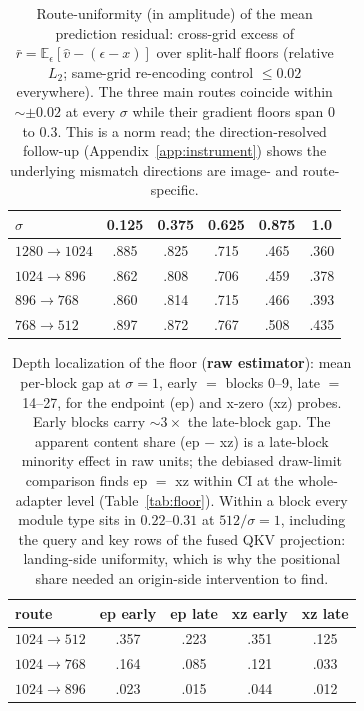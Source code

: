 \begin{table}[h]
\caption{Route-uniformity (in amplitude) of the mean prediction
residual: cross-grid
excess of $\bar r = \mathbb{E}_\epsilon[\hat v - (\epsilon - x)]$ over
split-half floors (relative $L_2$; same-grid re-encoding control
$\le 0.02$ everywhere). The three main routes coincide within
${\sim}\pm 0.02$ at every $\sigma$ while their gradient floors span $0$ to
$0.3$. This is a norm read; the direction-resolved follow-up
(Appendix~\ref{app:instrument}) shows the underlying mismatch directions
are image- and route-specific.}
\label{tab:residual}
\centering
\small
\begin{tabular}{lccccc}
\toprule
$\sigma$ & 0.125 & 0.375 & 0.625 & 0.875 & 1.0 \\
\midrule
$1280{\to}1024$ & .885 & .825 & .715 & .465 & .360 \\
$1024{\to}896$  & .862 & .808 & .706 & .459 & .378 \\
$896{\to}768$   & .860 & .814 & .715 & .466 & .393 \\
$768{\to}512$   & .897 & .872 & .767 & .508 & .435 \\
\bottomrule
\end{tabular}
\end{table}

\begin{table}[h]
\caption{Depth localization of the floor (\textbf{raw estimator}): mean
per-block gap at
$\sigma{=}1$, early $=$ blocks 0--9, late $=$ 14--27, for the endpoint
(ep) and x-zero (xz) probes. Early blocks carry ${\sim}3\times$ the
late-block gap. The apparent content share (ep $-$ xz) is a late-block
minority effect in raw units; the debiased draw-limit comparison finds
ep $=$ xz within CI at the whole-adapter level
(Table~\ref{tab:floor}). Within a block every module type sits in
$0.22$--$0.31$ at $512/\sigma{=}1$, including the query and key rows of
the fused QKV projection: landing-side uniformity, which is why the
positional share needed an origin-side intervention to find.}
\label{tab:depth}
\centering
\small
\begin{tabular}{lcccc}
\toprule
route & ep early & ep late & xz early & xz late \\
\midrule
$1024{\to}512$ & .357 & .223 & .351 & .125 \\
$1024{\to}768$ & .164 & .085 & .121 & .033 \\
$1024{\to}896$ & .023 & .015 & .044 & .012 \\
\bottomrule
\end{tabular}
\end{table}

